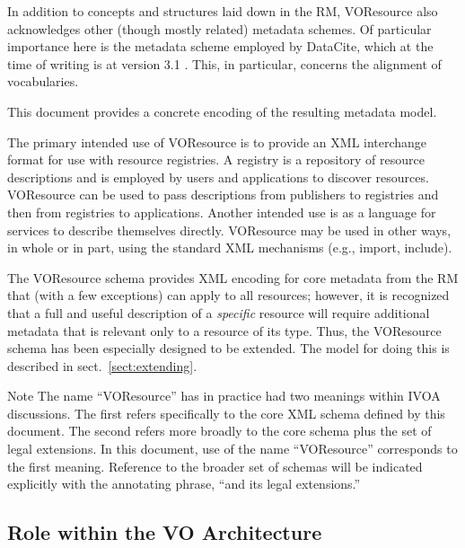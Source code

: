 \documentclass[11pt,a4paper]{ivoa}
\begin{document}
In addition to concepts and structures laid down in the RM, VOResource
also acknowledges other (though mostly related) metadata schemes.  Of
particular importance here is the metadata scheme employed by DataCite,
which at the time of writing is at version 3.1 \citep{std:DataCite31}.
This, in particular, concerns the alignment of vocabularies.

This document provides a concrete encoding of the resulting metadata
model.

The primary intended use of VOResource is to provide an XML interchange
format for use with resource registries.  A registry is a repository of
resource descriptions and is employed by users and applications to
discover resources.  VOResource can be used to pass descriptions from
publishers to registries and then from registries to applications.
Another intended use is as a language for services to describe themselves
directly.  VOResource may be used in other ways, in whole or in part,
using the standard XML mechanisms (e.g., import, include).  

The VOResource schema provides XML encoding for core
metadata from the RM that (with a few exceptions)
can apply to all resources; however, it is recognized that a full and
useful description of a \emph{specific} resource will require
additional metadata that is relevant only to a resource of its type.
Thus, the VOResource schema has been especially designed to be
extended.  The model for doing this is described in
sect.~\ref{sect:extending}.

\begin{admonition}{Note}
The name ``VOResource'' has in practice had two meanings within
IVOA discussions.  The first refers specifically to the core
XML schema defined by this document.  The second refers more
broadly to the core schema plus the set of legal extensions.
In this document, use of the name ``VOResource'' corresponds to
the first meaning.  Reference to the broader set of schemas
will be indicated explicitly with the annotating phrase, ``and
its legal extensions.''
\end{admonition}

\subsection{Role within the VO Architecture}
\label{sect:role}
\end{document}
